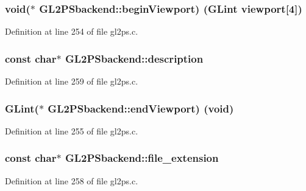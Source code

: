 \subsubsection[{begin\+Viewport}]{\setlength{\rightskip}{0pt plus 5cm}void($\ast$ G\+L2\+P\+Sbackend\+::begin\+Viewport) (G\+Lint viewport\mbox{[}4\mbox{]})}\label{struct_g_l2_p_sbackend_ae71958ad18c3dbeffdbb3f6895d0bbbf}


Definition at line 254 of file gl2ps.\+c.

\hypertarget{struct_g_l2_p_sbackend_a8725b2c22957f08b84553f89658aea78}{}
\subsubsection[{description}]{\setlength{\rightskip}{0pt plus 5cm}const char$\ast$ G\+L2\+P\+Sbackend\+::description}\label{struct_g_l2_p_sbackend_a8725b2c22957f08b84553f89658aea78}


Definition at line 259 of file gl2ps.\+c.

\hypertarget{struct_g_l2_p_sbackend_a73e6d71a33d571184eed89ef1e575786}{}
\subsubsection[{end\+Viewport}]{\setlength{\rightskip}{0pt plus 5cm}G\+Lint($\ast$ G\+L2\+P\+Sbackend\+::end\+Viewport) (void)}\label{struct_g_l2_p_sbackend_a73e6d71a33d571184eed89ef1e575786}


Definition at line 255 of file gl2ps.\+c.

\hypertarget{struct_g_l2_p_sbackend_a0a944434004f3751982f107d1b3c0f91}{}
\subsubsection[{file\+\_\+extension}]{\setlength{\rightskip}{0pt plus 5cm}const char$\ast$ G\+L2\+P\+Sbackend\+::file\+\_\+extension}\label{struct_g_l2_p_sbackend_a0a944434004f3751982f107d1b3c0f91}


Definition at line 258 of file gl2ps.\+c.

